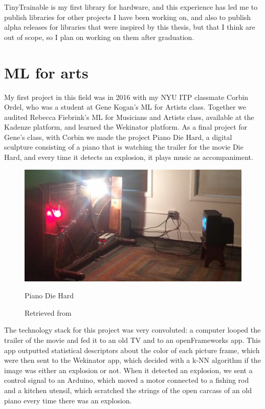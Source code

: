 TinyTrainable is my first library for hardware, and this experience has led me to publish libraries for other projects I have been working on, and also to publish alpha releases for libraries that were inspired by this thesis, but that I think are out of scope, so I plan on working on them after graduation.

\section{ML for arts}

My first project in this field was in 2016 with my \acrshort{NYU} \acrshort{ITP} classmate Corbin Ordel, who was a student at Gene Kogan's \acrshort{ML} for Artists class. Together we audited Rebecca Fiebrink's \acrshort{ML} for Musicians and Artists class, available at the Kadenze platform, and learned the Wekinator platform. As a final project for Gene's class, with Corbin we made the project Piano Die Hard, a digital sculpture consisting of a piano that is watching the trailer for the movie Die Hard, and every time it detects an explosion, it plays music as accompaniment.

\begin{figure}[ht]
  \centering
  \includegraphics[width=0.80\linewidth,height=0.40\textheight,keepaspectratio]{images/piano-die-hard.jpg}
  \caption{Piano Die Hard}
  \caption*{Retrieved from \cite{website-alt-ai}}
  \label{fig:piano-die-hard}
\end{figure}

The technology stack for this project was very convoluted: a computer looped the trailer of the movie and fed it to an old TV and to an openFrameworks app. This app outputted statistical descriptors about the color of each picture frame, which were then sent to the Wekinator app, which decided with a \acrshort{k-NN} algorithm if the image was either an explosion or not. When it detected an explosion, we sent a control signal to an Arduino, which moved a motor connected to a fishing rod and a kitchen utensil, which scratched the strings of the open carcass of an old piano every time there was an explosion.

